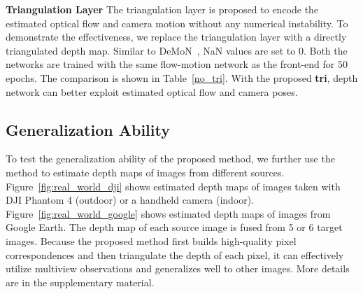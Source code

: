\documentclass[letterpaper, 10 pt, conference]{ieeeconf}  %
\begin{document}
\textbf{Triangulation Layer} The triangulation layer is proposed to encode the estimated optical flow and camera motion without any numerical instability. To demonstrate the effectiveness, we replace the triangulation layer with a directly triangulated depth map. Similar to DeMoN~\cite{demon}, NaN values are set to 0. Both the networks are trained with the same flow-motion network as the front-end for $50$ epochs. The comparison is shown in Table~\ref{no_tri}. With the proposed \textbf{tri}, depth network can better exploit estimated optical flow and camera poses.
 
\begin{table}[h]
\centering
\caption{Effectiveness of the triangulation layer.}
\label{no_tri}
\vspace{-0.4cm}
\end{table}
 
\subsection{Generalization Ability}
 
To test the generalization ability of the proposed method, we further use the method to estimate depth maps of images from different sources. Figure~\ref{fig:real_world_dji} shows estimated depth maps of images taken with DJI Phantom 4 (outdoor) or a handheld camera (indoor). Figure~\ref{fig:real_world_google} shows estimated depth maps of images from Google Earth. The depth map of each source image is fused from 5 or 6 target images. Because the proposed method first builds high-quality pixel correspondences and then triangulate the depth of each pixel, it can effectively utilize multiview observations and generalizes well to other images. More details are in the supplementary material.
 
\end{document}
